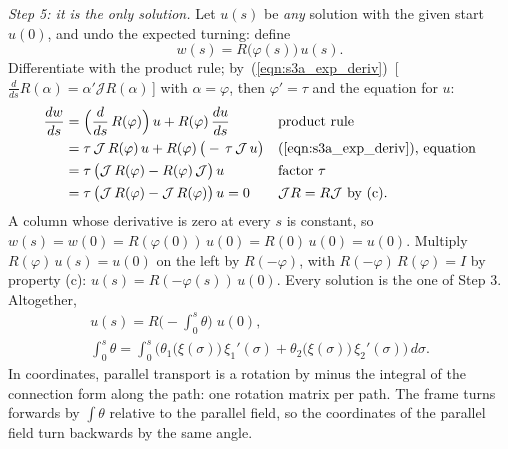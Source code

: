 \emph{Step 5: it is the only solution.} Let $u(s)$ be \emph{any} solution with the given start $u(0)$, and undo the expected turning: define
\begin{equation*}
w(s) = R\big(\varphi(s)\big)\, u(s) .
\end{equation*}
Differentiate with the product rule; by~(\ref{eqn:s3a_exp_deriv})~[\,$\frac{d}{ds}R(\alpha) = \alpha'\mathcal JR(\alpha)$\,] with $\alpha = \varphi$, then $\varphi' = \tau$ and the equation for $u$:
\begin{align*}
\frac{dw}{ds} &= \Big(\frac{d}{ds}\, R(\varphi)\Big)\, u + R(\varphi)\, \frac{du}{ds} && \text{product rule} \\
&= \tau\,\mathcal J\, R(\varphi)\, u + R(\varphi)\,\big(-\,\tau\,\mathcal J\, u\big) && \text{(\ref{eqn:s3a_exp_deriv}), equation} \\
&= \tau\,\big(\mathcal J\, R(\varphi) - R(\varphi)\,\mathcal J\big)\, u && \text{factor } \tau \\
&= \tau\,\big(\mathcal J\, R(\varphi) - \mathcal J\, R(\varphi)\big)\, u = 0 && \mathcal J R = R \mathcal J \text{ by (c).}
\end{align*}
A column whose derivative is zero at every $s$ is constant, so $w(s) = w(0) = R(\varphi(0))\,u(0) = R(0)\,u(0) = u(0)$. Multiply $R(\varphi)\,u(s) = u(0)$ on the left by $R(-\varphi)$, with $R(-\varphi)\,R(\varphi) = I$ by property (c): $u(s) = R(-\varphi(s))\,u(0)$. Every solution is the one of Step 3. Altogether,
\begin{equation}
\label{eqn:r3_transport}
\begin{gathered}
u(s) = R\Big(-\int_0^s \theta\Big)\; u(0), \\
\int_0^s \theta = \int_0^s \Big(\theta_1\big(\xi(\sigma)\big)\, \xi_1'(\sigma) + \theta_2\big(\xi(\sigma)\big)\, \xi_2'(\sigma)\Big)\, d\sigma .
\end{gathered}
\end{equation}
In coordinates, parallel transport is a rotation by minus the integral of the connection form along the path: one rotation matrix per path. The frame turns forwards by $\int\theta$ relative to the parallel field, so the coordinates of the parallel field turn backwards by the same angle.

